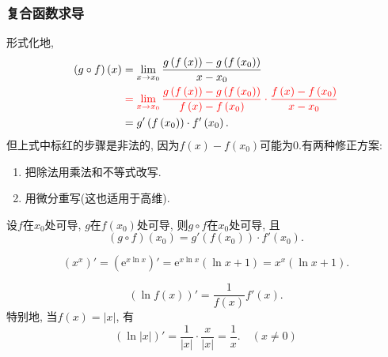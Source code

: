 \subsubsection{复合函数求导}
形式化地, 
\begin{equation}
  \begin{aligned}
     \left( g \circ f \right) \left( x \right) 
    & = \lim_{x \to x_0} \frac{g\left( f\left( x\right)  \right) - g\left( f\left( x_0 \right)  \right) }{x-x_0} 
    \\
    & \color{red}= \lim_{x \to x_0} \frac{g\left( f\left( x \right)  \right) - g\left( f\left( x_0 \right)  \right)}{f\left( x \right) - f\left( x_0 \right) } \cdot \frac{f\left( x \right) - f\left( x_0 \right) }{x-x_0}
    \\
    & = g'\left( f\left( x_0 \right)  \right) \cdot f'\left( x_0 \right) .
  \end{aligned}
\end{equation}
但上式中标红的步骤是非法的, 因为$f\left( x \right) - f\left( x_0 \right) $可能为$0$.有两种修正方案:
\begin{enumerate}
    \item 把除法用乘法和不等式改写.
    \item 用微分重写(这也适用于高维).
\end{enumerate}

\begin{theorem}
    设$f$在$x_0$处可导, $g$在$f\left( x_0 \right) $处可导, 则$g\circ f$在$x_0$处可导, 且
    \begin{equation}
      \left( g \circ f \right) \left( x_0 \right) = g'\left( f\left( x_0 \right)  \right) \cdot f'\left( x_0 \right) .
    \end{equation}
\end{theorem}

\begin{example}
    \begin{equation}
      (x^{x})' = \left( \mathrm{e}^{x \ln x} \right)' = \mathrm{e}^{x \ln x} \left( \ln x + 1 \right) = x^{x} \left( \ln x + 1 \right) .  
    \end{equation}
\end{example}

\begin{example}
    \begin{equation}
      \left( \ln f\left( x \right)  \right) ' = \frac{1}{f\left( x \right) } f'\left( x \right) .
    \end{equation}
    特别地, 当$f\left( x \right)  = \left| x \right| $, 有
    \begin{equation}
      \left( \ln \left| x \right|  \right) ' = \frac{1}{\left| x \right| } \cdot \frac{x}{\left| x \right| } = \frac{1}{x}. \quad (x \neq 0)
    \end{equation}
\end{example}

